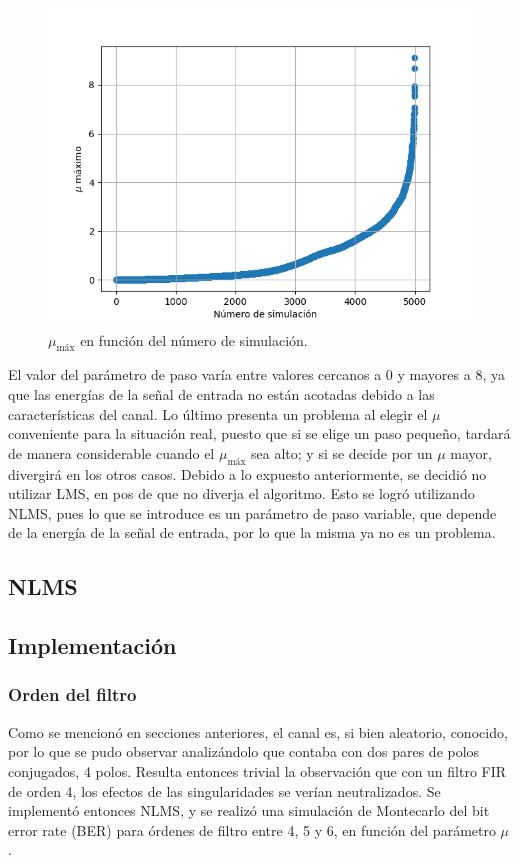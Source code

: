 \documentclass[main.tex]{subfiles}
\begin{document}
\begin{figure}[H]
    \centering
    \includegraphics[scale=0.5]{imagenes/lms_mus_scatter.png}
    \caption{$\mu_\text{máx}$ en función del número de simulación.}
\end{figure}

El valor del parámetro de paso varía entre valores cercanos a 0 y mayores a 8, 
ya que las energías de la señal de entrada no están acotadas debido a las características 
del canal. Lo último presenta un problema al elegir el $\mu$ conveniente para la situación real,
puesto que si se elige un paso pequeño, tardará de manera considerable cuando el $\mu_\text{máx}$ sea alto;
y si se decide por un $\mu$ mayor, divergirá en los otros casos. \newline
Debido a lo expuesto anteriormente, se decidió no utilizar LMS, en pos de que no diverja el algoritmo. 
Esto se logró utilizando NLMS, pues lo que se introduce es un parámetro de paso variable, que depende
de la energía de la señal de entrada, por lo que la misma ya no es un problema.

\subsection*{NLMS}
\subsection*{Implementación}
\subsubsection*{Orden del filtro}
Como se mencionó en secciones anteriores, el canal es, si bien aleatorio, conocido, por 
lo que se pudo observar analizándolo que contaba con dos pares de polos conjugados, 4 polos.
Resulta entonces trivial la observación que con un filtro FIR de orden 4, los efectos 
de las singularidades se verían neutralizados. Se implementó entonces NLMS, y se realizó
una simulación de Montecarlo del bit error rate (BER) para órdenes de filtro entre 4, 5 y 6, en función del parámetro 
$\mu$.
\end{document}
